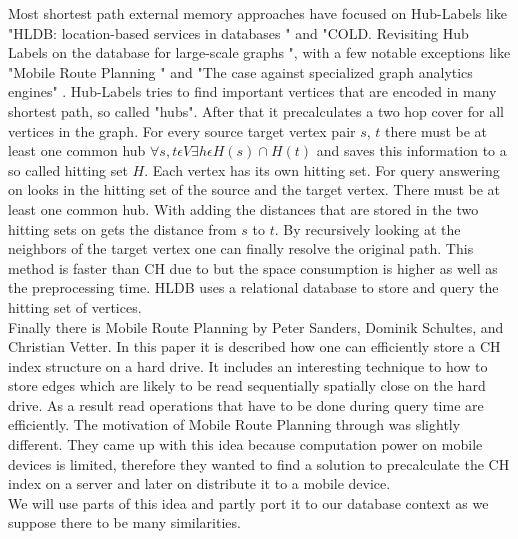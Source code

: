 Most shortest path external memory approaches have focused on Hub-Labels like "HLDB: location-based services in databases \cite{Abraham_2012}" and "COLD. Revisiting Hub Labels on the database for large-scale graphs \cite{efentakis2015cold}", with a few notable exceptions like "Mobile Route Planning \cite{Sanders}" and "The case against specialized graph analytics engines" \cite{fan2015case}.
Hub-Labels tries to find important vertices that are encoded in many shortest path, so called "hubs". 
After that it precalculates a two hop cover for all vertices in the graph.
For every source target vertex pair $s$, $t$ there must be at least one common hub $\forall s,t \epsilon V \exists h \epsilon H(s) \cap H(t)$ \cite{Abraham_2011} and saves this information to a so called hitting set $H$. 
Each vertex has its own hitting set. 
For query answering on looks in the hitting set of the source and the target vertex. 
There must be at least one common hub.
With adding the distances that are stored in the two hitting sets on gets the distance from $s$ to $t$.
By recursively looking at the neighbors of the target vertex one can finally resolve the original path. 
This method is faster than CH due to \cite{Abraham_2012} but the space consumption is higher as well as the preprocessing time. 
HLDB \cite{Abraham_2012} uses a relational database to store and query the hitting set of vertices.
\\
Finally there is Mobile Route Planning \cite{Sanders} by Peter Sanders, Dominik Schultes, and Christian Vetter.
In this paper it is described how one can efficiently store a CH index structure on a hard drive.
It includes an interesting technique to how to store edges which are likely to be read sequentially spatially close on the hard drive.
As a result read operations that have to be done during query time are efficiently.
The motivation of Mobile Route Planning \cite{Sanders} through was slightly different.
They came up with this idea because computation power on mobile devices is limited, therefore they wanted to find a solution to precalculate the CH index on a server and later on distribute it to a mobile device.
\\
We will use parts of this idea and partly port it to our database context as we suppose there to be many similarities.
